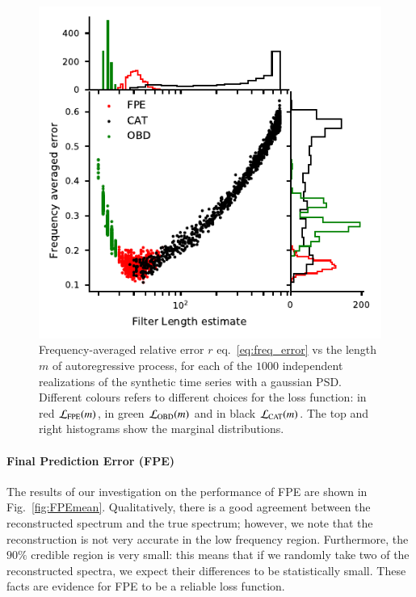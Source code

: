 \documentclass{aa}
\begin{document}
\begin{figure}
	\centering
	\includegraphics[width = \linewidth]{Images/optimisers_comparison/normal/error_length_contour.pdf}
	\caption{Frequency-averaged relative error $r$ eq.~\eqref{eq:freq_error} vs the length $m$ of autoregressive process, for each of the $1000$ independent realizations of the synthetic time series with a gaussian PSD. Different colours refers to different choices for the loss function: in red $\mathcal{L}_{\rm FPE}(m)$, in green $\mathcal{L}_{\rm OBD}(m)$ and in black $\mathcal{L}_{\rm CAT}(m)$. The top and right histograms show the marginal distributions.}
	\label{fig:optcomparison}
\end{figure}

\paragraph{Final Prediction Error (FPE)}
The results of our investigation on the performance of FPE are shown in Fig.~\ref{fig:FPEmean}.
Qualitatively, there is a good agreement between the reconstructed spectrum and the true spectrum; 
however, we note that the reconstruction is not very accurate in the low frequency region. 
Furthermore, the $90\%$ credible region is very small: this means that if we randomly take two of the reconstructed spectra, we expect their differences to be statistically small. These facts are evidence for FPE to be a reliable loss function.
\end{document}
